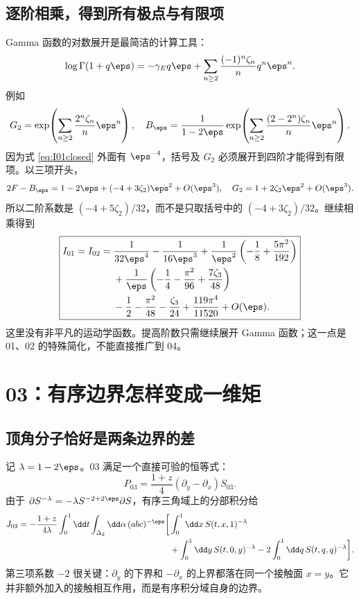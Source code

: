 \section{逐阶相乘，得到所有极点与有限项}
Gamma 函数的对数展开是最简洁的计算工具\cite{dlmfgamma}：
\begin{equation}
\log\Gamma(1+q\eps)=-\gamma_Eq\eps
+\sum_{n\ge2}\frac{(-1)^n\zeta_n}{n}q^n\eps^n.
\label{eq:loggamma}
\end{equation}
例如
\[
G_2=\exp\!\left(\sum_{n\ge2}\frac{2^n\zeta_n}{n}\eps^n\right),
\quad
B_\eps=\frac1{1-2\eps}
\exp\!\left(\sum_{n\ge2}\frac{(2-2^n)\zeta_n}{n}\eps^n\right).
\]
因为式 \eqref{eq:I01closed} 外面有 $\eps^{-4}$，括号及 $G_2$ 必须展开到四阶才能得到有限项。以三项开头，
\[
2F-B_\eps=1-2\eps+(-4+3\zeta_2)\eps^2+O(\eps^3),
\quad G_2=1+2\zeta_2\eps^2+O(\eps^3).
\]
所以二阶系数是 $(-4+5\zeta_2)/32$，而不是只取括号中的 $(-4+3\zeta_2)/32$。继续相乘得到
\begin{equation}
\boxed{\begin{aligned}
I_{01}=I_{02}={}&\frac1{32\eps^4}-\frac1{16\eps^3}
+\frac1{\eps^2}\left(-\frac18+\frac{5\pi^2}{192}\right)\\
&+\frac1\eps\left(-\frac14-\frac{\pi^2}{96}+\frac{7\zeta_3}{48}\right)\\
&-\frac12-\frac{\pi^2}{48}-\frac{\zeta_3}{24}
+\frac{119\pi^4}{11520}+O(\eps).
\end{aligned}}
\label{eq:result0102}
\end{equation}
这里没有非平凡的运动学函数。提高阶数只需继续展开 Gamma 函数；这一点是 01、02 的特殊简化，不能直接推广到 04。

\chapter{03：有序边界怎样变成一维矩}
\section{顶角分子恰好是两条边界的差}
记 $\lambda=1-2\eps$。03 满足一个直接可验的恒等式：
\begin{equation}
P_{03}=\frac{1+z}{4}(\partial_y-\partial_x)S_{03}.
\end{equation}
由于 $\partial S^{-\lambda}=-\lambda S^{-2+2\eps}\partial S$，有序三角域上的分部积分给
\begin{equation}
\begin{aligned}
J_{03}=-\frac{1+z}{4\lambda}\int_0^1\dd t\int_{\Delta_2}\dd\alpha\,(abc)^{-\eps}
\bigg[&\int_0^1\dd x\,S(t,x,1)^{-\lambda}\\
&+\int_0^1\dd y\,S(t,0,y)^{-\lambda}
-2\int_0^1\dd q\,S(t,q,q)^{-\lambda}\bigg].
\end{aligned}
\label{eq:03faces}
\end{equation}
第三项系数 $-2$ 很关键：$\partial_y$ 的下界和 $-\partial_x$ 的上界都落在同一个接触面 $x=y$。它并非额外加入的接触相互作用，而是有序积分域自身的边界。

